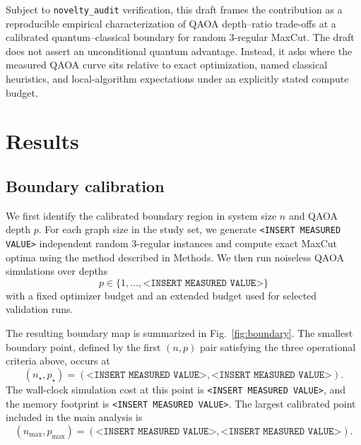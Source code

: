 \documentclass[reprint,aps,longbibliography]{revtex4-2}
\begin{document}
Subject to \texttt{novelty\_audit} verification, this draft frames the contribution as a reproducible empirical characterization of QAOA depth--ratio trade-offs at a calibrated quantum--classical boundary for random 3-regular MaxCut. The draft does not assert an unconditional quantum advantage. Instead, it asks where the measured QAOA curve sits relative to exact optimization, named classical heuristics, and local-algorithm expectations under an explicitly stated compute budget.

\section{Results}

\subsection{Boundary calibration}

We first identify the calibrated boundary region in system size $n$ and QAOA depth $p$. For each graph size in the study set, we generate \texttt{<INSERT MEASURED VALUE>} independent random 3-regular instances and compute exact MaxCut optima using the method described in Methods. We then run noiseless QAOA simulations over depths
\begin{equation}
  p\in\{1,\ldots,\texttt{<INSERT MEASURED VALUE>}\}
\end{equation}
with a fixed optimizer budget and an extended budget used for selected validation runs.

The resulting boundary map is summarized in Fig.~\ref{fig:boundary}. The smallest boundary point, defined by the first $(n,p)$ pair satisfying the three operational criteria above, occurs at
\begin{equation}
  (n_\star,p_\star)=
  (\texttt{<INSERT MEASURED VALUE>},\texttt{<INSERT MEASURED VALUE>}).
\end{equation}
The wall-clock simulation cost at this point is \texttt{<INSERT MEASURED VALUE>}, and the memory footprint is \texttt{<INSERT MEASURED VALUE>}. The largest calibrated point included in the main analysis is
\begin{equation}
  (n_{\max},p_{\max})=
  (\texttt{<INSERT MEASURED VALUE>},\texttt{<INSERT MEASURED VALUE>}).
\end{equation}
\end{document}

